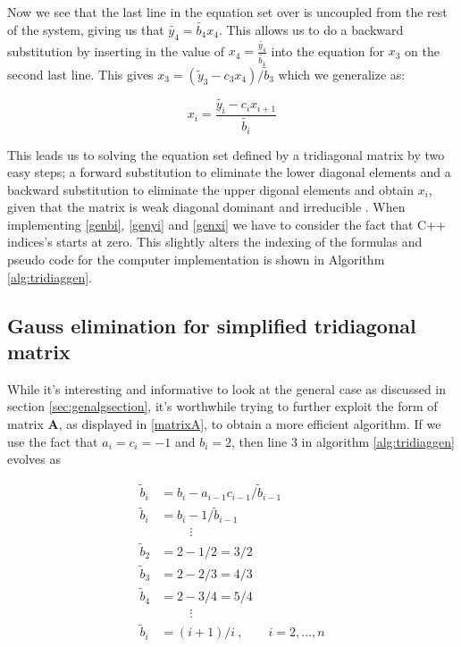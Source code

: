 \documentclass[12pt]{article}
\numberwithin{figure}{section}
\numberwithin{table}{section}
\begin{document}
\noindent Now we see that the last line in the equation set over is uncoupled from the rest of the system, giving us that $ \tilde{y_4} = \tilde{b_4} x_4$. This allows us to do a backward substitution by inserting in the value of $x_4 = \frac{\tilde{y_4}}{\tilde{b_4}}$ into the equation for $x_3$ on the second last line. This gives $x_3=(\tilde{y}_3-c_3x_4)/\tilde{b}_3$ which we generalize as:

\begin{equation}
 x_i = \frac{\tilde{y_i} - c_i x_{i+1}}{\tilde{b_i}} \label{genxi}
\end{equation}

\noindent This leads us to solving the equation set defined by a tridiagonal matrix by two easy steps; a forward substitution to eliminate the lower diagonal elements and a backward substitution to eliminate the upper digonal elements and obtain $x_i$, given that the matrix is weak diagonal dominant and irreducible \cite{Comp}. When implementing \eqref{genbi}, \eqref{genyi} and \eqref{genxi} we have to consider the fact that C++ indices's starts at zero. This slightly alters the indexing of the formulas and pseudo code for the computer implementation is shown in Algorithm \ref{alg:tridiaggen}.


\subsection{Gauss elimination for simplified tridiagonal matrix}
While it's interesting and informative to look at the general case as discussed in section \ref{sec:genalgsection}, it's worthwhile trying to further exploit the form of matrix $\mathbf{A}$, as displayed in \eqref{matrixA}, to obtain a more efficient algorithm. If we use the fact that $a_i=c_i=-1$ and $b_i=2$, then line 3 in algorithm \ref{alg:tridiaggen} evolves as

\begin{align}
	\tilde{b}_i&=b_i-a_{i-1}c_{i-1}/\tilde{b}_{i-1} \nonumber \\
    \tilde{b}_i&=b_i-1/\tilde{b}_{i-1} \nonumber \\
    &\hspace{1cm}\vdots \nonumber \\
    \tilde{b}_2&=2-1/2=3/2 \nonumber \\
    \tilde{b}_3&=2-2/3=4/3 \nonumber \\
    \tilde{b}_4&=2-3/4=5/4 \nonumber \\
    &\hspace{1cm}\vdots \nonumber \\
    \tilde{b}_i&=(i+1)/i \ , \qquad i=2,\dots,n \label{simpleb}
\end{align}
\end{document}
